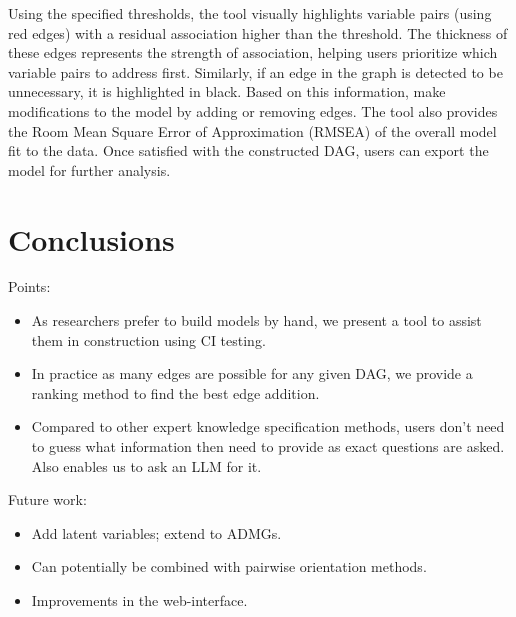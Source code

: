 \documentclass{uai2025} %
\begin{document}
Using the specified thresholds, the tool visually highlights variable pairs
(using red edges) with a residual association higher than the threshold. The
thickness of these edges represents the strength of association, helping users
prioritize which variable pairs to address first. Similarly, if an edge in the
graph is detected to be unnecessary, it is highlighted in black. Based on this
information, make modifications to the model by adding or removing edges. The
tool also provides the Room Mean Square Error of Approximation (RMSEA) of the
overall model fit to the data. Once satisfied with the constructed DAG, users
can export the model for further analysis.


\section{Conclusions}

Points:
\begin{itemize}
	\item As researchers prefer to build models by hand, we present a tool
		to assist them in construction using CI testing.
	\item In practice as many edges are possible for any given DAG, we provide
		a ranking method to find the best edge addition.
	\item Compared to other expert knowledge specification methods, users
		don't need to guess what information then need to provide as
		exact questions are asked. Also enables us to ask an LLM for
		it.
\end{itemize}

Future work:
\begin{itemize}
	\item Add latent variables; extend to ADMGs.
	\item Can potentially be combined with pairwise orientation methods.
	\item Improvements in the web-interface.
\end{itemize}



\newpage


\end{document}
